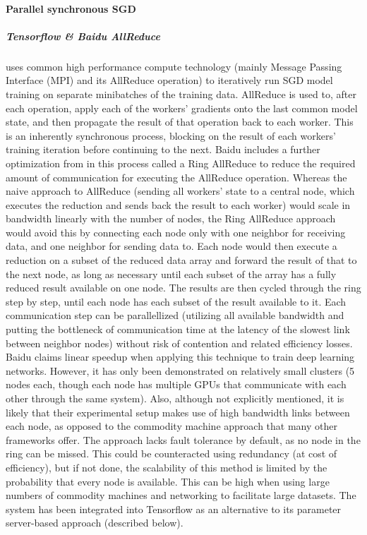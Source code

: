 \paragraph{Parallel synchronous SGD}


\subparagraph{Tensorflow \& Baidu AllReduce \citep{BaiduAllReduce2017}}

uses common high performance compute technology (mainly Message Passing Interface (MPI) and its AllReduce operation) to iteratively run SGD model training on separate minibatches of the training data. AllReduce is used to, after each operation, apply each of the workers’ gradients onto the last common model state, and then propagate the result of that operation back to each worker. This is an inherently synchronous process, blocking on the result of each workers’ training iteration before continuing to the next.
Baidu includes a further optimization from \citet{Patarasuk2009} in this process called a Ring AllReduce to reduce the required amount of communication for executing the AllReduce operation. Whereas the naive approach to AllReduce (sending all workers’ state to a central node, which executes the reduction and sends back the result to each worker) would scale in bandwidth linearly with the number of nodes, the Ring AllReduce approach would avoid this by connecting each node only with one neighbor for receiving data, and one neighbor for sending data to. Each node would then execute a reduction on a subset of the reduced data array and forward the result of that to the next node, as long as necessary until each subset of the array has a fully reduced result available on one node. The results are then cycled through the ring step by step, until each node has each subset of the result available to it. Each communication step can be parallellized (utilizing all available bandwidth and putting the bottleneck of communication time at the latency of the slowest link between neighbor nodes) without risk of contention and related efficiency losses.
Baidu claims linear speedup when applying this technique to train deep learning networks. However, it has only been demonstrated on relatively small clusters (5 nodes each, though each node has multiple GPUs that communicate with each other through the same system). Also, although not explicitly mentioned, it is likely that their experimental setup makes use of high bandwidth links between each node, as opposed to the commodity machine approach that many other frameworks offer. The approach lacks fault tolerance by default, as no node in the ring can be missed. This could be counteracted using redundancy (at cost of efficiency), but if not done, the scalability of this method is limited by the probability that every node is available. This can be high when using large numbers of commodity machines and networking to facilitate large datasets.
The system has been integrated into Tensorflow as an alternative to its parameter server-based approach (described below).

